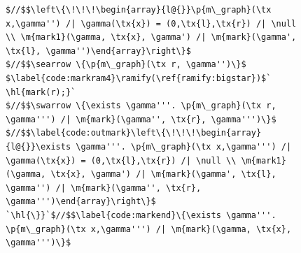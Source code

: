 \documentclass[acmsmall,screen]{acmart}
\newcommand{\tx}[1]{\text{#1}}
\newcommand{\p}[1]{\ensuremath{\mathsf{#1}}} \newcommand{\m}[1]{\ensuremath{\mathit{#1}}} \newcommand{\ma}[1]{\ensuremath{\mathcal{#1}}} \let\ramify\lightning
\newcommand{\hl}[1]{\colorbox{lightgray}{#1}}
\begin{document}
\begin{figure}[t]
\begin{lstlisting}[multicols=2]
$//$$\left\{\!\!\!\begin{array}{l@{}}\p{m\_graph}(\tx x,\gamma'') /| \gamma(\tx{x}) = (0,\tx{l},\tx{r}) /| \null \\ \m{mark1}(\gamma, \tx{x}, \gamma') /| \m{mark}(\gamma', \tx{l}, \gamma'')\end{array}\right\}$
$//$$\searrow \{\p{m\_graph}(\tx r, \gamma'')\}$
$\label{code:markram4}\ramify(\ref{ramify:bigstar})$` \hl{mark(r);}`
$//$$\swarrow \{\exists \gamma'''. \p{m\_graph}(\tx r, \gamma''') /| \m{mark}(\gamma'', \tx{r}, \gamma''')\}$
$//$$\label{code:outmark}\left\{\!\!\!\begin{array}{l@{}}\exists \gamma'''. \p{m\_graph}(\tx x,\gamma''') /| \gamma(\tx{x}) = (0,\tx{l},\tx{r}) /| \null \\ \m{mark1}(\gamma, \tx{x}, \gamma') /| \m{mark}(\gamma', \tx{l}, \gamma'') /| \m{mark}(\gamma'', \tx{r}, \gamma''')\end{array}\right\}$
`\hl{\}}`$//$$\label{code:markend}\{\exists \gamma'''. \p{m\_graph}(\tx x,\gamma''') /| \m{mark}(\gamma, \tx{x}, \gamma''')\}$
\end{lstlisting}



\end{figure}
\end{document}

